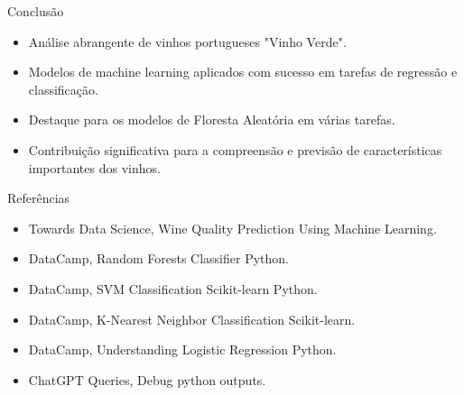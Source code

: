 \documentclass{beamer}
\begin{document}
    \begin{frame}{Conclusão}
        \begin{itemize}
            \item Análise abrangente de vinhos portugueses "Vinho Verde".
            \item Modelos de machine learning aplicados com sucesso em tarefas de regressão e classificação.
            \item Destaque para os modelos de Floresta Aleatória em várias tarefas.
            \item Contribuição significativa para a compreensão e previsão de características importantes dos vinhos.
        \end{itemize}
    \end{frame}

    \begin{frame}{Referências}
        \begin{itemize}
            \item Towards Data Science, Wine Quality Prediction Using Machine Learning.
            \item DataCamp, Random Forests Classifier Python.
            \item DataCamp, SVM Classification Scikit-learn Python.
            \item DataCamp, K-Nearest Neighbor Classification Scikit-learn.
            \item DataCamp, Understanding Logistic Regression Python.
            \item ChatGPT Queries, Debug python outputs.
        \end{itemize}
    \end{frame}
\end{document}
